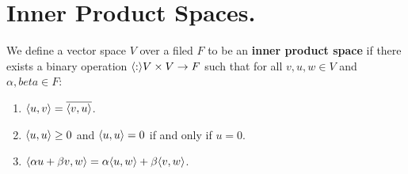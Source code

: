 
\section{Inner Product Spaces.}
\label{section1}

\begin{definition}
    We define a vector space $V$ over a filed  $F$ to be an  \textbf{inner product space} if there
    exists a binary operation $\langle :\rangle V \times V \rightarrow F $ such that for all  $v,u,w \in V$
    and  $\alpha, beta \in F$:
        \begin{enumerate}[label=(\arabic*)]
        \item $\langle u,v\rangle=\overline{\langle v,u\rangle}$.

        \item $\langle u,u\rangle \geq 0$ and $\langle u,u\rangle = 0$ if and only if  $u=0$.

        \item $\langle \alpha u+\beta v, w\rangle=\alpha\langle u,w\rangle+\beta\langle v,w\rangle$.

        \end{enumerate}
\end{definition}
